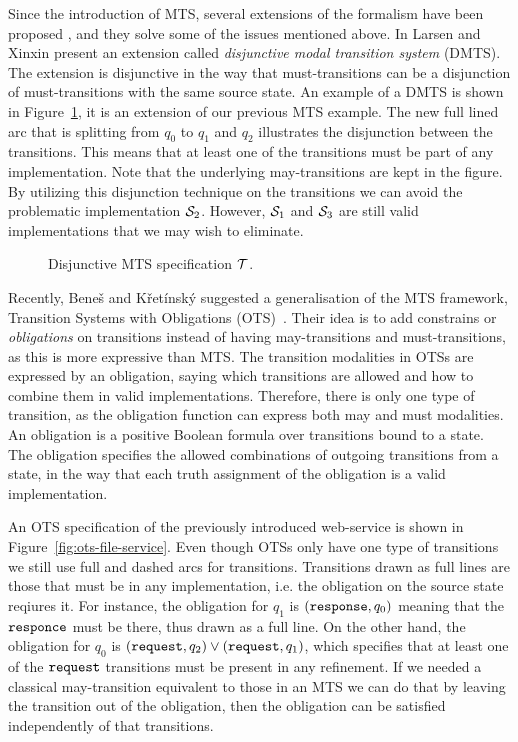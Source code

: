 Since the introduction of MTS, several extensions of the formalism have been proposed \cite{DBLP:conf/lics/LarsenX90,FS:JLAP:08, benes_et_al:OASIcs:2011:3070}, and they solve some of the issues mentioned above. In \cite{DBLP:conf/lics/LarsenX90} Larsen and Xinxin present an extension called \emph{disjunctive modal transition system} (DMTS). The extension is disjunctive in the way that must-transitions can be a disjunction of must-transitions with the same source state. An example of a DMTS is shown in Figure~\ref{fig:dmts-file-service}, it is an extension of our previous MTS example. The new full lined arc that is splitting from $q_0$ to $q_1$ and $q_2$ illustrates the disjunction between the  transitions. This means that at least one of the  transitions must be part of any implementation. Note that the underlying may-transitions are kept in the figure. By utilizing this disjunction technique on the  transitions we can avoid the problematic implementation $\S_2$. However, $\S_1$ and $\S_3$ are still valid implementations that we may wish to eliminate.


\begin{figure}[ht]      
\centering
    
    \caption{Disjunctive MTS specification $\T$.}
    \label{fig:dmts-file-service}
\end{figure}

Recently, Bene\v{s} and K\v{r}et\'{i}nsk\'{y} suggested a generalisation of the MTS framework, Transition Systems with Obligations (OTS)~\cite{benes_et_al:OASIcs:2011:3070}. Their idea is to add constrains or \emph{obligations} on transitions instead of having may-transitions and must-transitions, as this is more expressive than MTS. The transition modalities in OTSs are expressed by an obligation, saying which transitions are allowed and how to combine them in valid implementations. Therefore, there is only one type of transition, as the obligation function can express both may and must modalities. An obligation is a positive Boolean formula over transitions bound to a state. The obligation specifies the allowed combinations of outgoing transitions from a state, in the way that each truth assignment of the obligation is a valid implementation.

An OTS specification of the previously introduced web-service is shown in Figure~\ref{fig:ots-file-service}. Even though OTSs only have one type of transitions we still use full and dashed arcs for transitions. Transitions drawn as full lines are those that must be in any implementation, i.e. the obligation on the source state reqiures it. For instance, the obligation for $q_1$ is $(\transition{response}, q_0)$ meaning that the $\transition{responce}$ must be there, thus drawn as a full line. On the other hand, the obligation for $q_0$ is $(\transition{request},q_2) \vee (\transition{request},q_1)$, which specifies that at least one of the $\transition{request}$ transitions must be present in any refinement. If we needed a classical may-transition equivalent to those in an MTS we can do that by leaving the transition out of the obligation, then the obligation can be satisfied independently of that transitions. 

